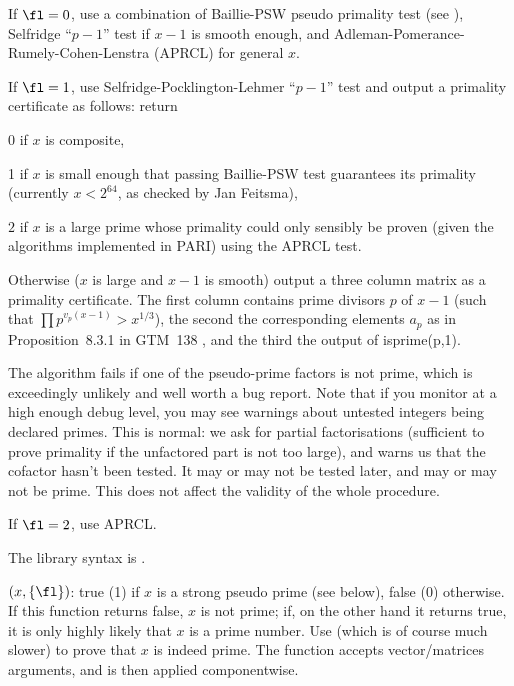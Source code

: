 If $\fl=0$, use a combination of Baillie-PSW pseudo primality test (see
), Selfridge ``$p-1$'' test if $x-1$ is smooth enough, and
Adleman-Pomerance-Rumely-Cohen-Lenstra (APRCL) for general $x$.

If $\fl=1$, use Selfridge-Pocklington-Lehmer ``$p-1$'' test and output a
primality certificate as follows: return

\item 0 if $x$ is composite,

\item 1 if $x$ is small enough that passing Baillie-PSW test guarantees
its primality (currently $x < 2^{64}$, as checked by Jan Feitsma),

\item $2$ if $x$ is a large prime whose primality could only sensibly be
proven (given the algorithms implemented in PARI) using the APRCL test.

\item Otherwise ($x$ is large and $x-1$ is smooth) output a three column
matrix as a primality certificate. The first column contains prime
divisors $p$ of $x-1$ (such that $\prod p^{v_p(x-1)} > x^{1/3}$), the second
the corresponding elements $a_p$ as in Proposition~8.3.1 in GTM~138 , and the
third the output of isprime(p,1).

The algorithm fails if one of the pseudo-prime factors is not prime, which is
exceedingly unlikely and well worth a bug report. Note that if you monitor
 at a high enough debug level, you may see warnings about
untested integers being declared primes. This is normal: we ask for partial
factorisations (sufficient to prove primality if the unfactored part is not
too large), and  warns us that the cofactor hasn't been tested.
It may or may not be tested later, and may or may not be prime. This does
not affect the validity of the whole  procedure.

If $\fl=2$, use APRCL.

The library syntax is .

$(x,\{\fl\})$: \label{se:ispseudoprime}true (1) if $x$ is a strong pseudo
prime (see below), false (0) otherwise. If this function returns false, $x$
is not prime; if, on the other hand it returns true, it is only highly likely
that $x$ is a prime number. Use  (which is of course much
slower) to prove that $x$ is indeed prime.
The function accepts vector/matrices arguments, and is then applied
componentwise.

